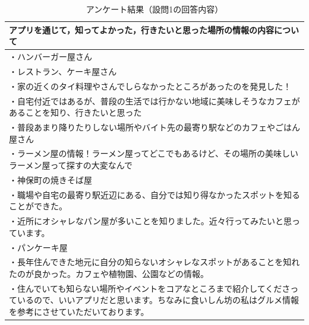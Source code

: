 \documentclass[a4paper]{jsarticle}
\begin{document}
\begin{enumerate}
\begin{enumerate}
\begin{enumerate}
  \begin{table}[H]
    \begin{center}
      \caption{アンケート結果（設問1の回答内容）}
      \renewcommand\arraystretch{1.2}
      \begin{tabular}{|p{15cm}|}
        \hline
        アプリを通じて，知ってよかった，行きたいと思った場所の情報の内容について \\
        \hline
        ・ハンバーガー屋さん \\
        ・レストラン、ケーキ屋さん \\
        ・家の近くのタイ料理やさんでしらなかったところがあったのを発見した！ \\
        ・自宅付近ではあるが、普段の生活では行かない地域に美味しそうなカフェがあることを知り、行きたいと思った \\
        ・普段あまり降りたりしない場所やバイト先の最寄り駅などのカフェやごはん屋さん \\
        ・ラーメン屋の情報！ラーメン屋ってどこでもあるけど、その場所の美味しいラーメン屋って探すの大変なんで \\
        ・神保町の焼きそば屋 \\
        ・職場や自宅の最寄り駅近辺にある、自分では知り得なかったスポットを知ることができた。 \\
        ・近所にオシャレなパン屋が多いことを知りました。近々行ってみたいと思っています。 \\
        ・パンケーキ屋 \\
        ・長年住んできた地元に自分の知らないオシャレなスポットがあることを知れたのが良かった。カフェや植物園、公園などの情報。 \\
        ・住んでいても知らない場所やイベントをコアなところまで紹介してくださっているので、いいアプリだと思います。ちなみに食いしん坊の私はグルメ情報を参考にさせていただいております。 \\
        \hline
      \end{tabular}
      \label{tab:curation-01-result}
    \end{center}
  \end{table}


\end{enumerate}
\end{enumerate}
\end{enumerate}
\end{document}
